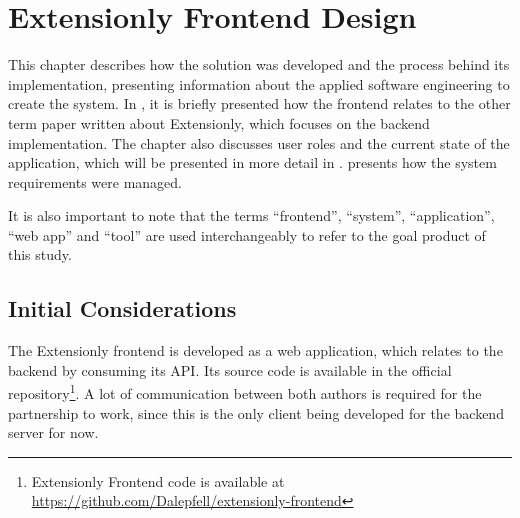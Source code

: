 \chapter{Extensionly Frontend Design}\label{extensionly}

This chapter describes how the solution was developed and the process behind its implementation, presenting information about the applied software engineering to create the system. In , it is briefly presented how the frontend relates to the other term paper written about Extensionly, which focuses on the backend implementation. The chapter also discusses user roles and the current state of the application, which will be presented in more detail in .  presents how the system requirements were managed.

It is also important to note that the terms ``frontend'', ``system'', ``application'', ``web app'' and ``tool'' are used interchangeably to refer to the goal product of this study.

\section{Initial Considerations}\label{ext:initial-considerations}

The Extensionly frontend is developed as a web application, which relates to the backend by consuming its \ac{API}. Its source code is available in the official repository\footnote{Extensionly Frontend code is available at \url{https://github.com/Dalepfell/extensionly-frontend}}. A lot of communication between both authors is required for the partnership to work, since this is the only client being developed for the backend server for now.

